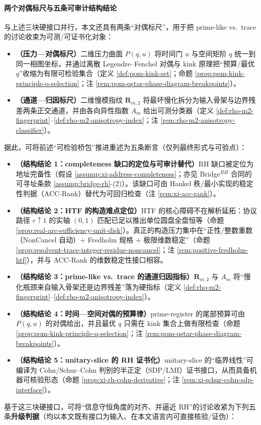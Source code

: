 \paragraph{两个对偶标尺与五条可审计结构结论}
与上述三块硬接口并行，本文还具有两条“对偶标尺”，用于把 prime-like vs.\ trace 的讨论收束为可测/可证书化对象：
\begin{itemize}
  \item \textbf{（压力—对偶标尺）}二维压力曲面 \(P(q,u)\) 将时间门 \(u\) 与空间矩阶 \(q\) 统一到同一相图坐标，并通过离散 Legendre--Fenchel 对偶与 kink 原理把“预算/最优 \(q\)”收缩为有限可检验集合（定义 \ref{def:pom-kink-set}；命题 \ref{prop:pom-kink-principle-q-selection}；注 \ref{rem:pom-qstar-phase-diagram-breakpoints}）。
  \item \textbf{（通道—归因标尺）}二维慢模指纹 \(\mathbf{R}_{m,2}\) 将最坏慢化拆分为输入骨架与边界残差两条正交通道，并由各向异性指数 \(A_m\) 给出可测分类器（定义 \ref{def:rho-m2-fingerprint}--\ref{def:rho-m2-anisotropy-index}；注 \ref{rem:rho-m2-anisotropy-classifier}）。
\end{itemize}
据此，可将前述“可检验桥包”推进重述为五条断言（仅列最终形式与可验点）：
\begin{itemize}
  \item \textbf{（结构结论 1：completeness 缺口的定位与可审计替代）}RH 缺口被定位为地址完备性（假设 \ref{assump:xi-address-completeness}；亦见 Bridge\(^{RH}\) 合同的可寻址条款 \ref{assump:bridge-rh}-(2)）。该缺口可由 Hankel 秩/最小实现的稳定性判据（ACC-Rank）替代为可回归检查（注 \ref{rem:xi-acc-rank}）。
  \item \textbf{（结构结论 2：HTF 的构造难点定位）}HTF 的核心障碍不在解析延拓：协议路径 \(r\uparrow 1\) 的实轴 \((0,1)\) 匹配已足以推出单位圆盘全盘恒等（命题 \ref{prop:real-arc-sufficiency-unit-disk}）。真正的构造压力集中在“正性/整数重数（NonCancel 自动）+ Fredholm 规格 + 极限维数稳定”（命题 \ref{prop:resolvent-trace-integer-residue-noncancel}；注 \ref{rem:positive-fredholm-htf}），并与 ACC-Rank 的维数稳定性接口相容。
  \item \textbf{（结构结论 3：prime-like vs.\ trace 的通道归因指标）}\(\mathbf{R}_{m,2}\) 与 \(A_m\) 将“慢化瓶颈来自输入骨架还是边界残差”落为硬指标（定义 \ref{def:rho-m2-fingerprint}--\ref{def:rho-m2-anisotropy-index}）。
  \item \textbf{（结构结论 4：时间—空间对偶的预算律）}prime-register 的尾部预算可由 \(P(q,u)\) 的对偶给出，并且最优 \(q\) 只需在 kink 集合上做有限检查（命题 \ref{prop:pom-kink-principle-q-selection}；注 \ref{rem:pom-qstar-phase-diagram-breakpoints}）。
  \item \textbf{（结构结论 5：unitary-slice 的 RH 证书化）}unitary-slice 的“临界线性”可编译为 Cohn/Schur--Cohn 判别的半正定（SDP/LMI）证书接口，从而具备机器可核验形态（命题 \ref{prop:xi-rh-cohn-derivative}；注 \ref{rem:xi-schur-cohn-sdp-interface}）。
\end{itemize}
基于这三块硬接口，可将“信息守恒角度的对齐、并逼近 RH”的讨论收紧为下列五条\textbf{升级判据}（均以本文既有接口为输入、在本文语言内可直接核验/证伪）：


